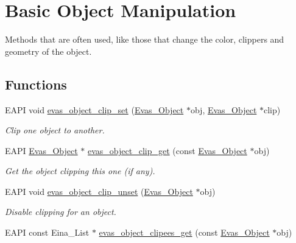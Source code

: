 \section{Basic Object Manipulation}
\label{group__Evas__Object__Group__Basic}


Methods that are often used, like those that change the color, clippers and geometry of the object.  


\subsection*{Functions}
\begin{DoxyCompactItemize}
\item 
EAPI void \hyperlink{group__Evas__Object__Group__Basic_ga19eabaaeec1ea375366e201f533f3d56}{evas\_\-object\_\-clip\_\-set} (\hyperlink{group__Evas__Object__Group_ga9e19e6dd1f517a0ba437c0114d3e7c97}{Evas\_\-Object} $\ast$obj, \hyperlink{group__Evas__Object__Group_ga9e19e6dd1f517a0ba437c0114d3e7c97}{Evas\_\-Object} $\ast$clip)
\begin{DoxyCompactList}\small\item\em Clip one object to another. \item\end{DoxyCompactList}\item 
EAPI \hyperlink{group__Evas__Object__Group_ga9e19e6dd1f517a0ba437c0114d3e7c97}{Evas\_\-Object} $\ast$ \hyperlink{group__Evas__Object__Group__Basic_gadd9e5c165ff2129dd902f43c669a0c1a}{evas\_\-object\_\-clip\_\-get} (const \hyperlink{group__Evas__Object__Group_ga9e19e6dd1f517a0ba437c0114d3e7c97}{Evas\_\-Object} $\ast$obj)
\begin{DoxyCompactList}\small\item\em Get the object clipping this one (if any). \item\end{DoxyCompactList}\item 
EAPI void \hyperlink{group__Evas__Object__Group__Basic_gaa7fcd13f310444d7c1541b4fd31fa7f8}{evas\_\-object\_\-clip\_\-unset} (\hyperlink{group__Evas__Object__Group_ga9e19e6dd1f517a0ba437c0114d3e7c97}{Evas\_\-Object} $\ast$obj)
\begin{DoxyCompactList}\small\item\em Disable clipping for an object. \item\end{DoxyCompactList}\item 
EAPI const Eina\_\-List $\ast$ \hyperlink{group__Evas__Object__Group__Basic_gaa73ed804aa051d0aa5faa1743e113887}{evas\_\-object\_\-clipees\_\-get} (const \hyperlink{group__Evas__Object__Group_ga9e19e6dd1f517a0ba437c0114d3e7c97}{Evas\_\-Object} $\ast$obj)

\end{DoxyCompactItemize}
